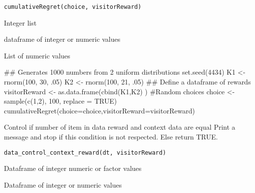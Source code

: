 \documentclass[letterpaper]{book}
\begin{document}
%
\begin{Usage}
\begin{verbatim}
cumulativeRegret(choice, visitorReward)
\end{verbatim}
\end{Usage}
%
\begin{Arguments}
\begin{ldescription}
\item[\code{choice}] Integer list

\item[\code{visitorReward}] dataframe of integer or numeric values
\end{ldescription}
\end{Arguments}
%
\begin{Value}
List of numeric values
\end{Value}
%
\begin{Examples}
\begin{ExampleCode}
## Generates 1000 numbers from 2 uniform distributions
set.seed(4434)
K1 <- rnorm(100, 30, .05)
K2 <- rnorm(100, 21, .05)
## Define a dataframe of rewards
visitorReward <- as.data.frame(cbind(K1,K2) )
#Random choices
choice <- sample(c(1,2), 100, replace = TRUE)
cumulativeRegret(choice=choice,visitorReward=visitorReward)

\end{ExampleCode}
\end{Examples}
%
\begin{Description}\relax
Control if number of item in data reward and context data are equal
Print a message and stop if this condition is not respected.
Else return TRUE.
\end{Description}
%
\begin{Usage}
\begin{verbatim}
data_control_context_reward(dt, visitorReward)
\end{verbatim}
\end{Usage}
%
\begin{Arguments}
\begin{ldescription}
\item[\code{dt}] Dataframe of integer numeric or factor values

\item[\code{visitorReward}] Dataframe of integer or numeric values
\end{ldescription}
\end{Arguments}
\end{document}
